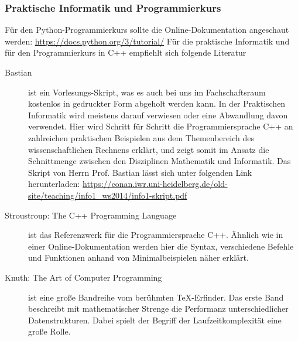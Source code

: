\subsubsection{Praktische Informatik und Programmierkurs}
Für den Python-Programmierkurs sollte die Online-Dokumentation angeschaut werden:
\url{https://docs.python.org/3/tutorial/}
Für die praktische Informatik und für den Programmierkurs in C++ empfiehlt sich folgende Literatur
\begin{description}
\item[Bastian]{
	ist ein Vorlesungs-Skript, was es auch bei uns im Fachschaftsraum kostenlos in gedruckter Form abgeholt werden kann. In der Praktischen Informatik wird meistens darauf verwiesen oder eine Abwandlung davon verwendet. Hier wird Schritt für Schritt die Programmiersprache C++ an zahlreichen praktischen Beispielen aus dem Themenbereich des wissenschaftlichen Rechnens erklärt, und zeigt somit im Ansatz die Schnittmenge zwischen den Disziplinen Mathematik und Informatik. Das Skript von Herrn Prof. Bastian lässt sich unter folgenden Link herunterladen: \url{https://conan.iwr.uni-heidelberg.de/old-site/teaching/info1_ws2014/info1-skript.pdf}}
	
\item[Stroustroup: The C++ Programming Language]{
	ist das Referenzwerk für die Programmiersprache C++. Ähnlich wie in einer Online-Dokumentation werden hier die Syntax, verschiedene Befehle und Funktionen anhand von Minimalbeispielen näher erklärt.}

\item[Knuth: The Art of Computer Programming]{ist eine große Bandreihe vom berühmten TeX-Erfinder. Das erste Band beschreibt mit mathematischer Strenge die Performanz unterschiedlicher Datenstrukturen. Dabei spielt der Begriff der Laufzeitkomplexität eine große Rolle.}

\end{description}

